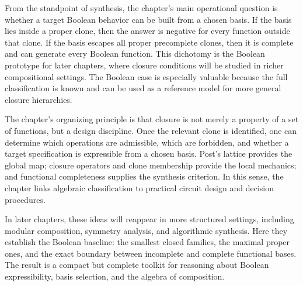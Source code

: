 From the standpoint of synthesis, the chapter's main operational question is whether a target Boolean behavior can be built from a chosen basis. If the basis lies inside a proper clone, then the answer is negative for every function outside that clone. If the basis escapes all proper precomplete clones, then it is complete and can generate every Boolean function. This dichotomy is the Boolean prototype for later chapters, where closure conditions will be studied in richer compositional settings. The Boolean case is especially valuable because the full classification is known and can be used as a reference model for more general closure hierarchies.

The chapter's organizing principle is that closure is not merely a property of a set of functions, but a design discipline. Once the relevant clone is identified, one can determine which operations are admissible, which are forbidden, and whether a target specification is expressible from a chosen basis. Post's lattice provides the global map; closure operators and clone membership provide the local mechanics; and functional completeness supplies the synthesis criterion. In this sense, the chapter links algebraic classification to practical circuit design and decision procedures.

In later chapters, these ideas will reappear in more structured settings, including modular composition, symmetry analysis, and algorithmic synthesis. Here they establish the Boolean baseline: the smallest closed families, the maximal proper ones, and the exact boundary between incomplete and complete functional bases. The result is a compact but complete toolkit for reasoning about Boolean expressibility, basis selection, and the algebra of composition.
